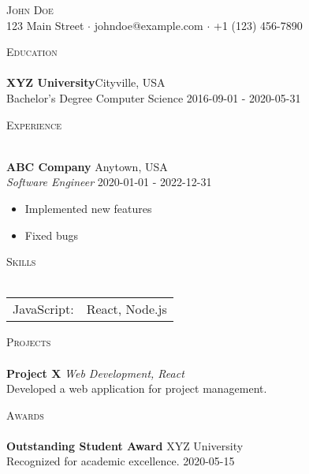\documentclass[a4paper]{article}
\newcommand{\lineunder} {
    \vspace*{-8pt} \\
    \hspace*{-18pt} \hrulefill \\
}
\newcommand{\header} [1] {
    {\hspace*{-18pt}\vspace*{6pt} \textsc{#1}}
    \vspace*{-6pt} \lineunder
}
\begin{document}
    \vspace*{-40pt}

\vspace*{-10pt}
\begin{center}
  {\Huge \scshape {John Doe}}\\
  123 Main Street $\cdot$ johndoe@example.com $\cdot$ +1 (123) 456-7890\\
\end{center}


      \header{Education}
      \textbf{XYZ University}\hfill Cityville, USA\\
Bachelor's Degree Computer Science \hfill 2016-09-01 - 2020-05-31\\
\vspace{2mm}


      \header{Experience}
      \vspace{1mm}

      \textbf{ABC Company} \hfill Anytown, USA\\
          \textit{Software Engineer} \hfill 2020-01-01 - 2022-12-31\\
          \vspace{-1mm}
\begin{itemize} \itemsep 1pt
  \item Implemented new features
  \item Fixed bugs
\end{itemize}


    \header{Skills}
\begin{tabular}{ l l }
JavaScript: & React, Node.js \\
\end{tabular}
\vspace{2mm}


    \header{Projects}
      {\textbf{Project X}} {\sl Web Development, React} \\
Developed a web application for project management.\\
\vspace*{2mm}


    \header{Awards}
      \textbf{Outstanding Student Award} \hfill XYZ University\\
Recognized for academic excellence. \hfill 2020-05-15\\
\vspace*{2mm}

    \ 
    
\end{document}
